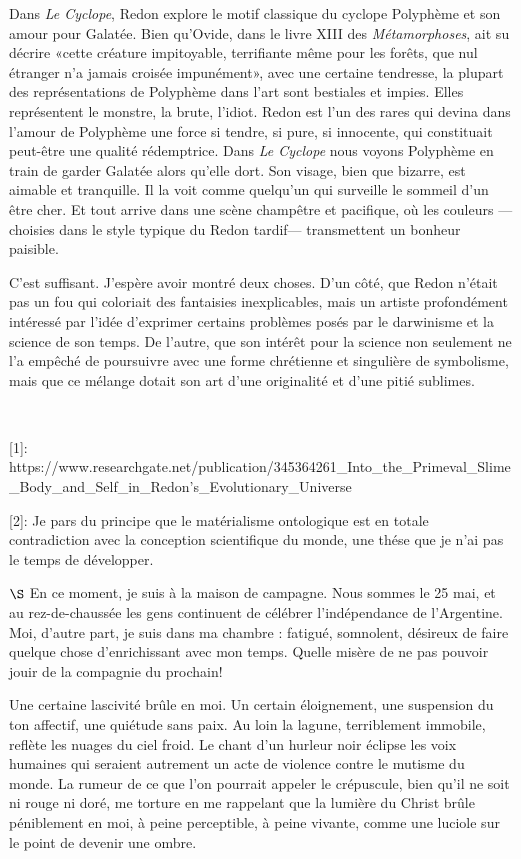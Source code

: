 \documentclass[a4paper, 12pt]{article}
\begin{document}
Dans \textit{Le Cyclope}, Redon explore le motif classique du cyclope Polyphème
et son amour pour Galatée. Bien qu'Ovide, dans le livre XIII des
\textit{Métamorphoses}, ait su décrire «cette créature impitoyable, terrifiante
même pour les forêts, que nul étranger n'a jamais croisée impunément», avec
une certaine tendresse, la plupart des représentations de Polyphème dans l'art
sont bestiales et impies. Elles représentent le monstre, la brute, l'idiot.
Redon est l'un des rares qui devina dans l'amour de Polyphème une force si
tendre, si pure, si innocente, qui constituait peut-être une qualité rédemptrice.
Dans \textit{Le Cyclope} nous voyons Polyphème en train de garder Galatée alors
qu'elle dort. Son visage, bien que bizarre, est aimable et tranquille. Il la
voit comme quelqu'un qui surveille le sommeil d'un être cher. Et tout arrive dans une
scène champêtre et pacifique, où les couleurs ---choisies dans le style typique du
Redon tardif--- transmettent un bonheur paisible.

C'est suffisant. J'espère avoir montré deux choses. D'un côté, que Redon n'était pas
un fou qui coloriait des fantaisies inexplicables, mais un artiste profondément
intéressé par l'idée d'exprimer certains problèmes posés par le darwinisme et la science
de son temps. De l'autre, que son intérêt pour la science non seulement ne l'a
empêché de poursuivre avec une forme chrétienne et singulière de symbolisme, mais
que ce mélange dotait son art d'une originalité et d'une pitié sublimes.




~


[1]: https://www.researchgate.net/publication/345364261_Into_the_Primeval_Slime_Body_and_Self_in_Redon's_Evolutionary_Universe

[2]: Je pars du principe que le matérialisme ontologique est en totale
contradiction avec la conception scientifique du monde, une thése que je n'ai
pas le temps de développer.

\pagebreak

$\S$ En ce moment, je suis à la maison de campagne. Nous sommes le 25 mai,
et au rez-de-chaussée les gens continuent de célébrer l'indépendance de
l'Argentine. Moi, d'autre part, je suis dans ma chambre : fatigué, somnolent,
désireux de faire quelque chose d'enrichissant avec mon temps. Quelle misère de ne
pas pouvoir jouir de la compagnie du prochain!

Une certaine lascivité brûle en moi. Un certain éloignement, une suspension
du ton affectif, une quiétude sans paix. Au loin la lagune, terriblement
immobile, reflète les nuages du ciel froid. Le chant d'un hurleur noir éclipse
les voix humaines qui seraient autrement un acte de violence contre le mutisme du
monde. La rumeur de ce que l'on pourrait appeler le crépuscule, bien qu'il ne
soit ni rouge ni doré, me torture en me rappelant que la lumière du Christ brûle
péniblement en moi, à peine perceptible, à peine vivante, comme une luciole sur
le point de devenir une ombre.
\end{document}
